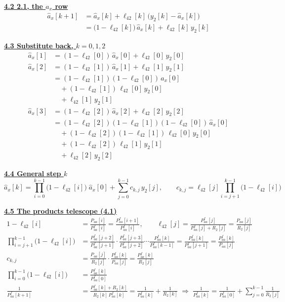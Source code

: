 \documentclass[11pt,a4paper]{ctexart}
\newcommand{\hd}[1]{\par\bigskip\noindent\underline{\textbf{#1}}}
\begin{document}
\hd{4.2 2.1, the $a_x$ row}
\[
\begin{aligned}
\hat a_x[k+1] &= \hat a_x[k] + \ell_{42}[k]\,\big(y_2[k] - \hat a_x[k]\big) \\
&= \big(1 - \ell_{42}[k]\big)\,\hat a_x[k] + \ell_{42}[k]\,y_2[k]
\end{aligned}
\]

\hd{4.3 Substitute back, $k = 0, 1, 2$}
\[
\begin{aligned}
\hat a_x[1] &= (1-\ell_{42}[0])\,\hat a_x[0] + \ell_{42}[0]\,y_2[0] \\[0.8ex]
\hat a_x[2] &= (1-\ell_{42}[1])\,\hat a_x[1] + \ell_{42}[1]\,y_2[1] \\
&= (1-\ell_{42}[1])(1-\ell_{42}[0])\,\hat a_x[0] \\
&\quad + (1-\ell_{42}[1])\,\ell_{42}[0]\,y_2[0] \\
&\quad + \ell_{42}[1]\,y_2[1] \\[0.8ex]
\hat a_x[3] &= (1-\ell_{42}[2])\,\hat a_x[2] + \ell_{42}[2]\,y_2[2] \\
&= (1-\ell_{42}[2])(1-\ell_{42}[1])(1-\ell_{42}[0])\,\hat a_x[0] \\
&\quad + (1-\ell_{42}[2])(1-\ell_{42}[1])\,\ell_{42}[0]\,y_2[0] \\
&\quad + (1-\ell_{42}[2])\,\ell_{42}[1]\,y_2[1] \\
&\quad + \ell_{42}[2]\,y_2[2]
\end{aligned}
\]

\hd{4.4 General step $k$}
\[
\hat a_x[k] = \prod_{i=0}^{k-1}\big(1 - \ell_{42}[i]\big)\;\hat a_x[0] + \sum_{j=0}^{k-1} c_{k,j}\,y_2[j],
\qquad
c_{k,j} = \ell_{42}[j]\prod_{i=j+1}^{k-1}\big(1 - \ell_{42}[i]\big)
\]

\clearpage
\hd{4.5 The products telescope (4.1)}
\[
\begin{aligned}
1 - \ell_{42}[i] &= \frac{P_{aa}[i]}{P^f_{aa}[i]} = \frac{P^f_{aa}[i+1]}{P^f_{aa}[i]}, \qquad
\ell_{42}[j] = \frac{P^f_{aa}[j]}{P^f_{aa}[j] + R_2[j]} = \frac{P_{aa}[j]}{R_2[j]} \\
\prod_{i=j+1}^{k-1}\big(1 - \ell_{42}[i]\big) &= \frac{P^f_{aa}[j+2]}{P^f_{aa}[j+1]}\cdot\frac{P^f_{aa}[j+3]}{P^f_{aa}[j+2]}\cdots\frac{P^f_{aa}[k]}{P^f_{aa}[k-1]}
= \frac{P^f_{aa}[k]}{P^f_{aa}[j+1]} = \frac{P^f_{aa}[k]}{P_{aa}[j]} \\
c_{k,j} &= \frac{P_{aa}[j]}{R_2[j]}\cdot\frac{P^f_{aa}[k]}{P_{aa}[j]} = \frac{P^f_{aa}[k]}{R_2[j]} \\
\prod_{i=0}^{k-1}\big(1 - \ell_{42}[i]\big) &= \frac{P^f_{aa}[k]}{P^f_{aa}[0]} \\
\frac{1}{P^f_{aa}[k+1]} &= \frac{P^f_{aa}[k] + R_2[k]}{R_2[k]\,P^f_{aa}[k]} = \frac{1}{P^f_{aa}[k]} + \frac{1}{R_2[k]}
\;\Rightarrow\;
\frac{1}{P^f_{aa}[k]} = \frac{1}{P^f_{aa}[0]} + \sum_{j=0}^{k-1}\frac{1}{R_2[j]}
\end{aligned}
\]
\end{document}

